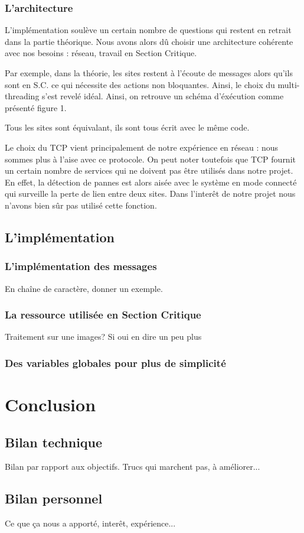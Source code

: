 \documentclass[a4paper,12pt]{article}
\begin{document}
\subsubsection{L'architecture}

L'implémentation soulève un certain nombre de questions qui restent en retrait dans la partie théorique. Nous avons alors dû choisir une architecture cohérente avec nos besoins : réseau, travail en Section Critique.

Par exemple, dans la théorie, les sites restent à l'écoute de messages alors qu'ils sont en S.C. ce qui nécessite des actions non bloquantes. Ainsi, le choix du multi-threading s'est revelé idéal.
Ainsi, on retrouve un schéma d'éxécution comme présenté figure 1.



Tous les sites sont équivalant, ils sont tous écrit avec le même code.

Le choix du TCP vient principalement de notre expérience en réseau : nous sommes plus à l'aise avec ce protocole. 
On peut noter toutefois que TCP fournit un certain nombre de services qui ne doivent pas être utilisés dans notre projet. En effet, la détection de pannes est alors aisée avec le système en mode connecté qui surveille la perte de lien entre deux sites. Dans l'interêt de notre projet nous n'avons bien sûr pas utilisé cette fonction.

\subsection{L'implémentation}

\subsubsection{L'implémentation des messages}
En chaîne de caractère, donner un exemple.
\subsubsection{La ressource utilisée en Section Critique}
Traitement sur une images? Si oui en dire un peu plus
\subsubsection{Des variables globales pour plus de simplicité}



\section{Conclusion}

\subsection{Bilan technique}
Bilan par rapport aux objectifs.
Trucs qui marchent pas, à améliorer...

\subsection{Bilan personnel}
Ce que ça nous a apporté, interêt, expérience...


\end{document}
